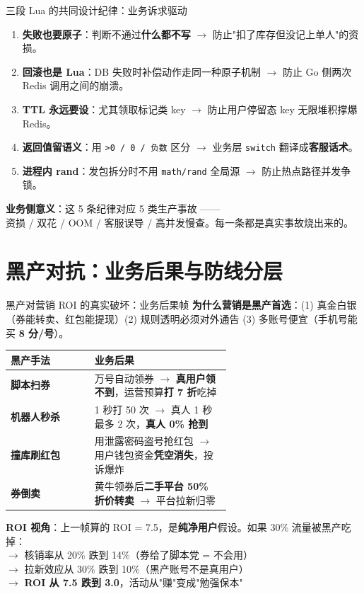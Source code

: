 \documentclass[aspectratio=169,11pt]{beamer}
\begin{document}
\begin{frame}[shrink]{三段 Lua 的共同设计纪律：业务诉求驱动}
\begin{enumerate}\itemsep1pt
  \item \textbf{失败也要原子}：判断不通过\textbf{什么都不写} $\to$ 防止"扣了库存但没记上单人"的资损。
  \item \textbf{回滚也是 Lua}：DB 失败时补偿动作走同一种原子机制 $\to$ 防止 Go 侧两次 Redis 调用之间的崩溃。
  \item \textbf{TTL 永远要设}：尤其领取标记类 key $\to$ 防止用户停留态 key 无限堆积撑爆 Redis。
  \item \textbf{返回值留语义}：用 \texttt{>0 / 0 / 负数} 区分 $\to$ 业务层 \texttt{switch} 翻译成\textbf{客服话术}。
  \item \textbf{进程内 rand}：发包拆分时不用 \texttt{math/rand} 全局源 $\to$ 防止热点路径并发争锁。
\end{enumerate}
\vspace{2mm}
\small \textbf{业务侧意义}：这 5 条纪律对应 5 类生产事故 ——\\
资损 / 双花 / OOM / 客服误导 / 高并发慢查。每一条都是真实事故烧出来的。
\end{frame}

\section{黑产对抗：业务后果与防线分层}

\begin{frame}[shrink]{黑产对营销 ROI 的真实破坏：业务后果帧}
\textbf{为什么营销是黑产首选}：(1) 真金白银（券能转卖、红包能提现）(2) 规则透明必须对外通告 (3) 多账号便宜（手机号能买 \textbf{8 分/号}）。

\vspace{1mm}
\begin{tabular}{@{}lp{0.62\linewidth}@{}}
\toprule
黑产手法 & 业务后果 \\
\midrule
\textbf{脚本扫券}      & 万号自动领券 $\to$ \textbf{真用户领不到}，运营预算\textbf{打 7 折}吃掉 \\
\textbf{机器人秒杀}    & 1 秒打 50 次 $\to$ 真人 1 秒最多 2 次，\textbf{真人 0\% 抢到} \\
\textbf{撞库刷红包}    & 用泄露密码盗号抢红包 $\to$ 用户钱包资金\textbf{凭空消失}，投诉爆炸 \\
\textbf{券倒卖}        & 黄牛领券后\textbf{二手平台 50\% 折价转卖} $\to$ 平台拉新归零 \\
\bottomrule
\end{tabular}
\vspace{2mm}

\small \textbf{ROI 视角}：上一帧算的 ROI = 7.5，是\textbf{纯净用户}假设。如果 30\% 流量被黑产吃掉：\\
$\to$ 核销率从 20\% 跌到 14\%（券给了脚本党 = 不会用）\\
$\to$ 拉新效应从 30\% 跌到 10\%（黑产账号不是真用户）\\
$\to$ \textbf{ROI 从 7.5 跌到 3.0}，活动从"赚"变成"勉强保本"
\end{frame}
\end{document}
